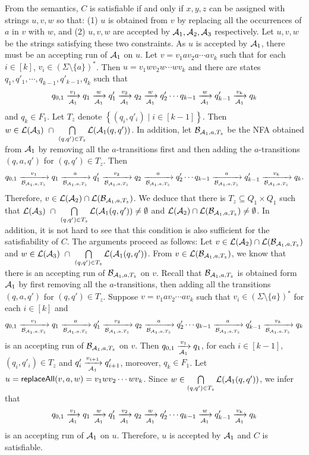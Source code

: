 From the semantics, $C$ is satisfiable if and only if $x, y, z$ can be assigned with strings $u, v, w$ so that: (1) $u$ is obtained from $v$ by replacing all the occurrences of $a$ in $v$ with $w$, and (2) $u, v, w$ are accepted by $\mathcal{A}_1, \mathcal{A}_2, \mathcal{A}_3$ respectively. Let $u,v,w$ be the strings satisfying these two constraints. As $u$ is accepted by $\mathcal{A}_1$,  there must be an accepting run of $\mathcal{A}_1$ on $u$. Let $v = v_1 a v_2 a \cdots a v_k$ such that for each $i \in [k]$, $v_i \in (\Sigma \setminus \{a\})^*$. Then $u = v_1 w v_2 w \cdots w v_k$ and there are states $q_1, q'_1, \cdots, q_{k-1}, q'_{k-1}, q_k$  such that 
%
$$
q_{0,1} \xrightarrow[\mathcal{A}_1]{v_1} q_1 \xrightarrow[\mathcal{A}_1]{w} q'_1 \xrightarrow[\mathcal{A}_1]{v_2} q_2 \xrightarrow[\mathcal{A}_1]{w} q'_2 \cdots q_{k-1} \xrightarrow[\mathcal{A}_1]{w} q'_{k-1} \xrightarrow[\mathcal{A}_1]{v_k} q_k
$$
%
 and $q_k \in F_{1}$. Let $T_z$ denote $\left\{(q_i, q'_i) \mid i \in [k-1] \right\}$. Then $w \in \mathcal{L}(\mathcal{A}_3)\ \cap\ \bigcap \limits_{(q, q') \in T_z} \mathcal{L}(\mathcal{A}_1(q, q'))$. In addition, let  $\mathcal{B}_{\mathcal{A}_1,a,T_z}$ be the NFA obtained from $\mathcal{A}_1$ by removing all the $a$-transitions first and then adding the $a$-transitions $(q, a, q')$ for $(q, q') \in T_z$. Then 
$$
q_{0,1} \xrightarrow[\mathcal{B}_{\mathcal{A}_1,a,T_z}]{v_1} q_1 \xrightarrow[\mathcal{B}_{\mathcal{A}_1,a,T_z}]{a} q'_1 \xrightarrow[\mathcal{B}_{\mathcal{A}_1,a,T_z}]{v_2} q_2 \xrightarrow[\mathcal{B}_{\mathcal{A}_1,a,T_z}]{a} q'_2 \cdots q_{k-1} \xrightarrow[\mathcal{B}_{\mathcal{A}_1,a,T_z}]{a} q'_{k-1} \xrightarrow[\mathcal{B}_{\mathcal{A}_1,a,T_z}]{v_k} q_k.
$$
%
Therefore, 
$v \in \mathcal{L}(\mathcal{A}_2) \cap \mathcal{L}(\mathcal{B}_{\mathcal{A}_1,a,T_z})$. We deduce that there is $T_z \subseteq Q_1 \times Q_1$ such that $\mathcal{L}(\mathcal{A}_3)\ \cap\ \bigcap \limits_{(q, q') \in T_z} \mathcal{L}(\mathcal{A}_1(q, q')) \neq \emptyset$ and $ \mathcal{L}(\mathcal{A}_2) \cap \mathcal{L}(\mathcal{B}_{\mathcal{A}_1,a,T_z}) \neq \emptyset$. In addition, it is not hard to see that this condition is also sufficient for the satisfiability of $C$. The arguments proceed as follows: Let $v \in  \mathcal{L}(\mathcal{A}_2) \cap \mathcal{L}(\mathcal{B}_{\mathcal{A}_1,a,T_z})$ and $w \in \mathcal{L}(\mathcal{A}_3)\ \cap\ \bigcap \limits_{(q, q') \in T_z} \mathcal{L}(\mathcal{A}_1(q, q'))$. From $v \in \mathcal{L}(\mathcal{B}_{\mathcal{A}_1,a,T_z})$, we know that there is an accepting run of $\mathcal{B}_{\mathcal{A}_1,a,T_z}$ on $v$. Recall that $\mathcal{B}_{\mathcal{A}_1,a,T_z}$ is obtained form $\mathcal{A}_1$ by first removing all the $a$-transitions, then adding all the transitions $(q,a,q')$ for $(q,q') \in T_z$.  Suppose $v = v_1 a v_2 \cdots a v_k$ such that $v_i \in (\Sigma \setminus \{a\})^*$ for each $i \in [k]$ and  
$$
q_{0,1} \xrightarrow[\mathcal{B}_{\mathcal{A}_1,a,T_z}]{v_1} q_1 \xrightarrow[\mathcal{B}_{\mathcal{A}_1,a,T_z}]{a} q'_1 \xrightarrow[\mathcal{B}_{\mathcal{A}_1,a,T_z}]{v_2} q_2 \xrightarrow[\mathcal{B}_{\mathcal{A}_1,a,T_z}]{a} q'_2 \cdots q_{k-1} \xrightarrow[\mathcal{B}_{\mathcal{A}_1,a,T_z}]{a} q'_{k-1} \xrightarrow[\mathcal{B}_{\mathcal{A}_1,a,T_z}]{v_k} q_k
$$
is an accepting run of $\mathcal{B}_{\mathcal{A}_1,a,T_z}$ on $v$. Then $q_{0,1} \xrightarrow[\mathcal{A}_1]{v_1} q_1$, for each $i \in [k-1]$, $(q_i, q'_i) \in T_z$ and $q'_i \xrightarrow[\mathcal{A}_1]{v_{i+1}} q'_{i+1}$, moreover, $q_k \in F_1$.
Let $u = \mathsf{replaceAll}(v, a, w)=v_1 w v_2 \cdots w v_k$. Since $w \in \bigcap \limits_{(q, q') \in T_z} \mathcal{L}(\mathcal{A}_1(q, q'))$,  we infer that
$$
q_{0,1} \xrightarrow[\mathcal{A}_1]{v_1} q_1 \xrightarrow[\mathcal{A}_1]{w} q'_1 \xrightarrow[\mathcal{A}_1]{v_2} q_2 \xrightarrow[\mathcal{A}_1]{w} q'_2 \cdots q_{k-1} \xrightarrow[\mathcal{A}_1]{w} q'_{k-1} \xrightarrow[\mathcal{A}_1]{v_k} q_k
$$
is an accepting run of $\mathcal{A}_1$ on $u$. Therefore, $u$ is accepted by $\mathcal{A}_1$ and $C$ is satisfiable.


